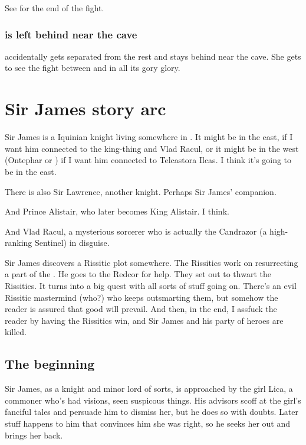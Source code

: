 See  for the end of the fight.






\subsubsection{\Shilred{} is left behind near the cave}
\Shilred{} accidentally gets separated from the rest and stays behind near the cave. 
She gets to see the fight between \Ishnaruchaefir{} and \Teshrial{} in all its gory glory. 















\section{Sir James story arc}
Sir James is a \human{} Iquinian knight living somewhere in \Velcad{}. 
It might be in the east, if I want him connected to the king-thing and Vlad Racul, or it might be in the west (Ontephar or \Scyrum) if I want him connected to Telcastora Ilcas. 
I think it's going to be in the east. 

There is also Sir Lawrence, another knight. 
Perhaps Sir James' companion. 

And Prince Alistair, who later becomes King Alistair. 
I think. 

And Vlad Racul, a mysterious sorcerer who is actually the \dragon{} Candrazor (a high-ranking Sentinel) in disguise. 

Sir James discovers a Rissitic plot somewhere. 
The Rissitics work on resurrecting a part of the \Haskelek{} \daemon. 
He goes to the Redcor for help. They set out to thwart the Rissitics. 
It turns into a big quest with all sorts of stuff going on. 
There's an evil Rissitic mastermind (who?) who keeps outsmarting them, but somehow the reader is assured that good will prevail. 
And then, in the end, I assfuck the reader by having the Rissitics win, and Sir James and his party of heroes are killed. 




\subsection{The beginning}
Sir James, as a knight and minor lord of sorts, is approached by the girl Lica, a commoner who's had visions, seen suspicous things. 
His advisors scoff at the girl's fanciful tales and persuade him to dismiss her, but he does so with doubts. 
Later stuff happens to him that convinces him she was right, so he seeks her out and brings her back. 

